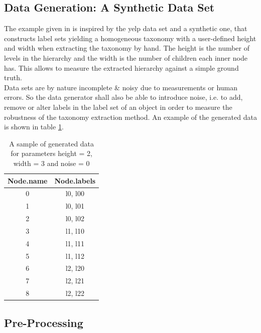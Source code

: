 \subsection{Data Generation: A Synthetic Data Set}\label{\positionnumber}
The example given in  is inspired by the yelp data set and a synthetic one, that constructs label sets yielding a homogeneous taxonomy with a user-defined height and width when extracting the taxonomy by hand. The height is the number of levels in the hierarchy and the width is the number of children each inner node has. This allows to measure the extracted hierarchy against a simple ground truth. \\
Data sets are by nature incomplete \& noisy due to measurements or human errors.
So the data generator shall also be able to introduce noise, i.e. to add, remove or alter labels in the label set of an object in order to measure the robustness of the taxonomy extraction method. 
An example of the generated data is shown in table \ref{tab:datagen}.
\begin{table}[htp]
     \centering
     \begin{tabular}{c c} \toprule
            Node.name & Node.labels \\ \midrule
            0 & l0, l00 \\ 
            1 & l0, l01 \\ 
            2 & l0, l02 \\ 
            3 & l1, l10 \\ 
            4 & l1, l11 \\ 
            5 & l1, l12 \\
            6 & l2, l20 \\ 
            7 & l2, l21 \\ 
            8 & l2, l22 \\ \bottomrule
        \end{tabular}
    \caption{A sample of generated data for parameters height = 2, width = 3 and noise = 0 }
    \label{tab:datagen}
\end{table}{}

\subsection{Pre-Processing}\label{\positionnumber}
